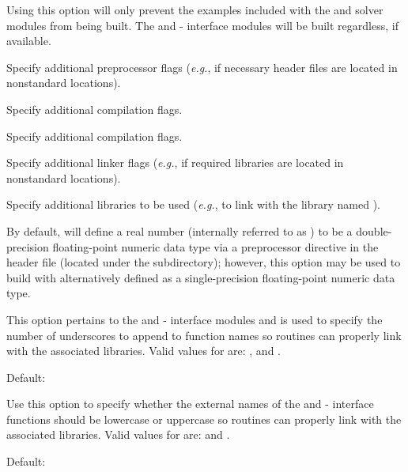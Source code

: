 \begin{config}
  Using this option will only prevent the {\F} examples included with the
  {\kinsol} and {\cvode} solver modules from being built. The {\fkinsol}
  and {\fcvode} {\F}-{\C} interface modules will be built regardless, if
  available.

\item {}

  Specify additional {\C} preprocessor flags 
  ({\em e.g.},  if necessary header files are located in nonstandard locations).

\item {}

  Specify additional {\C} compilation flags.

\item {}

  Specify additional {\F} compilation flags.

\item {}

  Specify additional linker flags 
  ({\em e.g.},  if required libraries are located in nonstandard locations).

\item {}

  Specify additional libraries to be used 
  ({\em e.g.},  to link with the library named ).

\item {}

  By default, {\sundials} will define a real number (internally referred to as
  ) to be a double-precision floating-point numeric data type via
  a preprocessor directive in the header file  (located under
  the  subdirectory); however, this option may be
  used to build {\sundials} with  alternatively defined as a
  single-precision floating-point numeric data type.

\item {}

  This option pertains to the {\fkinsol} and {\fcvode} {\F}-{\C} interface
  modules and is used to specify the number of underscores to append to
  function names so {\F} routines can properly link with the associated
  {\sundials} libraries. Valid values for  are: , 
  and .

  Default: 

\item {}

  Use this option to specify whether the external names of the {\fkinsol} and
  {\fcvode} {\F}-{\C} interface functions should be lowercase or uppercase so
  {\F} routines can properly link with the associated {\sundials} libraries. 
  Valid values for  are:  and .

  Default: 

\end{config}

